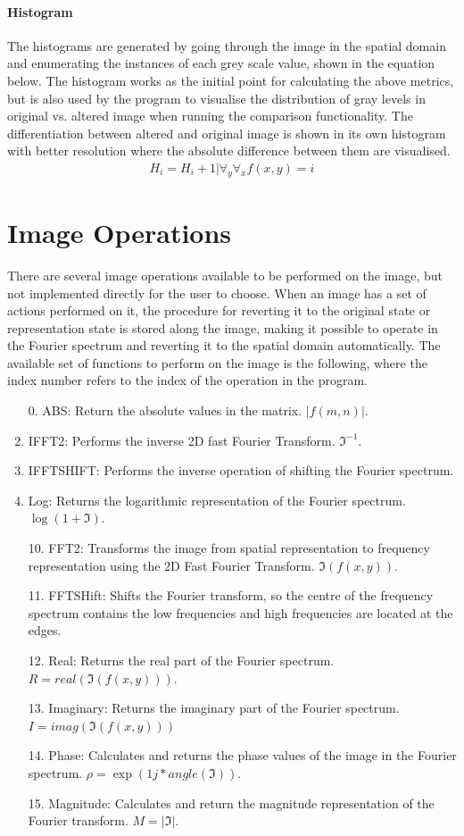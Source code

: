 \paragraph{Histogram}
The histograms are generated by going through the image in the spatial domain
and enumerating the instances of each grey scale value, shown in the equation
below.  The histogram works as the initial point for calculating the above
metrics, but is also used by the program to visualise the distribution of gray
levels in original vs. altered image when running the comparison functionality.
The differentiation between altered and original image is shown in its own
histogram with better resolution where the absolute difference between them are
visualised.
\begin{align}
	H_i = H_i + 1 | \forall_y\forall_x f(x,y) = i
\end{align}


\section{Image Operations}
There are several image operations available to be performed on the image, but
not implemented directly for the user to choose. When an image has a set of
actions performed on it, the procedure for reverting it to the original state or
representation state is stored along the image, making it possible to operate in
the Fourier spectrum and reverting it to the spatial domain automatically. The 
available set of functions to perform on the image is the following, where the
index number refers to the index of the operation in the program.
\begin{enumerate}
	\item[0.] ABS: Return the absolute values in the matrix. $|f(m,n)|$.
	\item IFFT2: Performs the inverse 2D fast Fourier Transform. $\Im^{-1}$.
	\item IFFTSHIFT: Performs the inverse operation of shifting the Fourier
		spectrum.
	\item Log: Returns the logarithmic representation of the Fourier spectrum.
		$\log(1+\Im)$.
	\item[10.] FFT2: Transforms the image from spatial representation to frequency
		representation using the 2D Fast Fourier Transform. $\Im( f(x,y) )$.
	\item[11.] FFTSHift: Shifts the Fourier transform, so the centre of the
		frequency spectrum contains the low frequencies and high frequencies are
		located at the edges.
	\item[12.] Real: Returns the real part of the Fourier spectrum. 
		$R = real(\Im(f(x,y)))$.
	\item[13.] Imaginary: Returns the imaginary part of the Fourier spectrum.
		$I = imag(\Im(f(x,y)))$
	\item[14.] Phase: Calculates and returns the phase values of the image in the
		Fourier spectrum. $\rho=\exp(1j*angle(\Im))$.
	\item[15.] Magnitude: Calculates and return the magnitude representation of
		the Fourier transform. $M=|\Im|$.
\end{enumerate}

